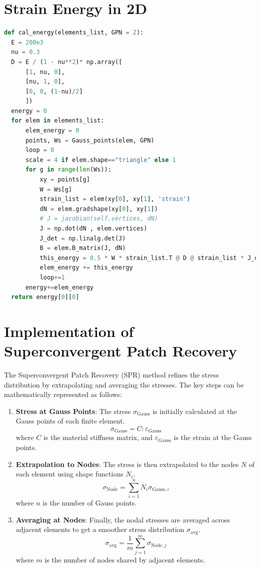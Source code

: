 \documentclass[twoside,twocolumn,10pt]{article}
\begin{document}
\section{Strain Energy in 2D}
\label{Apdx:energy}
\begin{lstlisting}[language=Python, caption=Strain energy in 2D]
def cal_energy(elements_list, GPN = 2):
  E = 200e3
  nu = 0.3
  D = E / (1 - nu**2)* np.array([
      [1, nu, 0],
      [nu, 1, 0],
      [0, 0, (1-nu)/2]
      ])
  energy = 0
  for elem in elements_list:
      elem_energy = 0
      points, Ws = Gauss_points(elem, GPN)
      loop = 0
      scale = 4 if elem.shape=="triangle" else 1
      for g in range(len(Ws)):
          xy = points[g]
          W = Ws[g]
          strain_list = elem(xy[0], xy[1], 'strain')
          dN = elem.gradshape(xy[0], xy[1])
          # J = jacobian(self.vertices, dN)
          J = np.dot(dN , elem.vertices)
          J_det = np.linalg.det(J)
          B = elem.B_matrix(J, dN)
          this_energy = 0.5 * W * strain_list.T @ D @ strain_list * J_det #* scale
          elem_energy += this_energy 
          loop+=1
      energy+=elem_energy
  return energy[0][0]
\end{lstlisting}


\section{Implementation of Superconvergent Patch Recovery}
\label{Apdx:SPR}
The Superconvergent Patch Recovery (SPR) method refines the stress distribution by extrapolating and averaging the stresses. The key steps can be mathematically represented as follows:

\begin{enumerate}
    \item \textbf{Stress at Gauss Points}: The stress \( \sigma_{\text{Gauss}} \) is initially calculated at the Gauss points of each finite element.
    \[
    \sigma_{\text{Gauss}} = C : \varepsilon_{\text{Gauss}}
    \]
    where \( C \) is the material stiffness matrix, and \( \varepsilon_{\text{Gauss}} \) is the strain at the Gauss points.

    \item \textbf{Extrapolation to Nodes}: The stress is then extrapolated to the nodes \( N \) of each element using shape functions \( N_i \).
    \[
    \sigma_{\text{Node}} = \sum_{i=1}^{n} N_i \sigma_{\text{Gauss}, i}
    \]
    where \( n \) is the number of Gauss points.

    \item \textbf{Averaging at Nodes}: Finally, the nodal stresses are averaged across adjacent elements to get a smoother stress distribution \( \sigma_{\text{avg}} \).
    \[
    \sigma_{\text{avg}} = \frac{1}{m} \sum_{j=1}^{m} \sigma_{\text{Node}, j}
    \]
    where \( m \) is the number of nodes shared by adjacent elements.
\end{enumerate}



 
\end{document}
